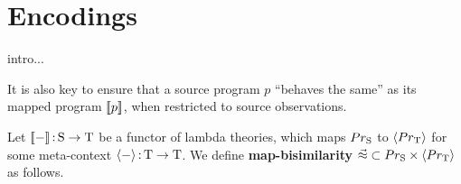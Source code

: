 \documentclass{article}
\begin{document}





\newpage

\section{Encodings}

intro...

\vspace{2em}

It is also key to ensure that a source program $p$ ``behaves the same'' as its mapped program $[\![p]\!]$, when restricted to source observations.

\begin{definition}
    Let $[\![-]\!]\,{:}\, \mathrm{S}\to \mathrm{T}$ be a functor of lambda theories, which maps $Pr_{\mathrm{S}}$ to $\langle Pr_{\mathrm{T}}\rangle$ for some meta-context $\langle -\rangle\,{:}\, \mathrm{T}\to \mathrm{T}$. We define \textbf{map-bisimilarity} $\vec{\approx}\subset Pr_{\mathrm{S}}\times \langle Pr_{\mathrm{T}}\rangle$ as follows.

\end{definition}
\end{document}
